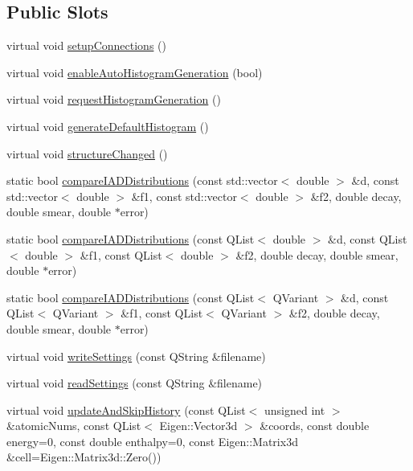\subsection*{Public Slots}
\begin{DoxyCompactItemize}
\item 
virtual void \hyperlink{classGlobalSearch_1_1Structure_aff5394b9be0fa599c58f906d9a03f9d5}{setup\-Connections} ()
\item 
virtual void \hyperlink{classGlobalSearch_1_1Structure_a36f95cfbd571cce162a4bc59bb468f61}{enable\-Auto\-Histogram\-Generation} (bool)
\item 
virtual void \hyperlink{classGlobalSearch_1_1Structure_aaed562bf0ad4fe7bec1567eb84dbeee2}{request\-Histogram\-Generation} ()
\item 
virtual void \hyperlink{classGlobalSearch_1_1Structure_a57ae57cebf3df177a1363b91383a1c69}{generate\-Default\-Histogram} ()
\item 
virtual void \hyperlink{classGlobalSearch_1_1Structure_a1e30a18add5bd7e217546333262010ad}{structure\-Changed} ()
\item 
static bool \hyperlink{classGlobalSearch_1_1Structure_a92cca2b7d5a566d69dd228d267758c73}{compare\-I\-A\-D\-Distributions} (const std\-::vector$<$ double $>$ \&d, const std\-::vector$<$ double $>$ \&f1, const std\-::vector$<$ double $>$ \&f2, double decay, double smear, double $\ast$error)
\item 
static bool \hyperlink{classGlobalSearch_1_1Structure_a70f9ced5a098560bad9fe97d1bb6361a}{compare\-I\-A\-D\-Distributions} (const Q\-List$<$ double $>$ \&d, const Q\-List$<$ double $>$ \&f1, const Q\-List$<$ double $>$ \&f2, double decay, double smear, double $\ast$error)
\item 
static bool \hyperlink{classGlobalSearch_1_1Structure_aaed919f70884814f824aac01d619f004}{compare\-I\-A\-D\-Distributions} (const Q\-List$<$ Q\-Variant $>$ \&d, const Q\-List$<$ Q\-Variant $>$ \&f1, const Q\-List$<$ Q\-Variant $>$ \&f2, double decay, double smear, double $\ast$error)
\item 
virtual void \hyperlink{classGlobalSearch_1_1Structure_af6da83169c21363c545ef3ee01d891d3}{write\-Settings} (const Q\-String \&filename)
\item 
virtual void \hyperlink{classGlobalSearch_1_1Structure_a352a550ebb2c8e511e3ad400a98b1373}{read\-Settings} (const Q\-String \&filename)
\item 
virtual void \hyperlink{classGlobalSearch_1_1Structure_a29a46bef48b3c9045b6e87ca87c2c6cb}{update\-And\-Skip\-History} (const Q\-List$<$ unsigned int $>$ \&atomic\-Nums, const Q\-List$<$ Eigen\-::\-Vector3d $>$ \&coords, const double energy=0, const double enthalpy=0, const Eigen\-::\-Matrix3d \&cell=Eigen\-::\-Matrix3d\-::\-Zero())

\end{DoxyCompactItemize}
